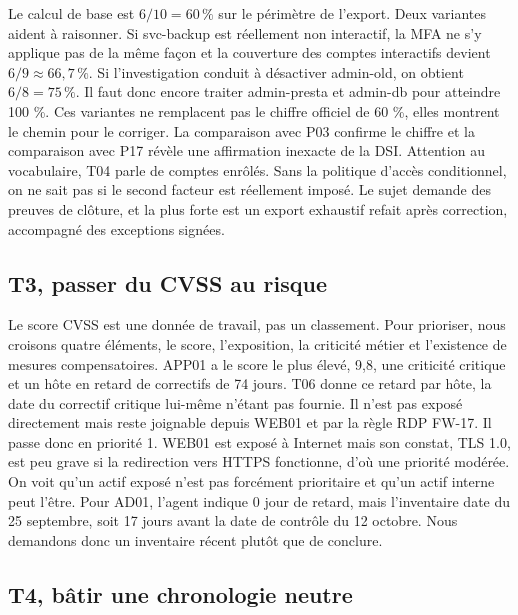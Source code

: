\documentclass[11pt,a4paper]{article}
\begin{document}
Le calcul de base est $6 / 10 = 60\,\%$ sur le périmètre de l'export. Deux variantes aident à raisonner. Si svc-backup est réellement non interactif, la MFA ne s'y applique pas de la même façon et la couverture des comptes interactifs devient $6 / 9 \approx 66{,}7\,\%$. Si l'investigation conduit à désactiver admin-old, on obtient $6 / 8 = 75\,\%$. Il faut donc encore traiter admin-presta et admin-db pour atteindre 100 \%. Ces variantes ne remplacent pas le chiffre officiel de 60 \%, elles montrent le chemin pour le corriger. La comparaison avec P03 confirme le chiffre et la comparaison avec P17 révèle une affirmation inexacte de la DSI. Attention au vocabulaire, T04 parle de comptes enrôlés. Sans la politique d'accès conditionnel, on ne sait pas si le second facteur est réellement imposé. Le sujet demande des preuves de clôture, et la plus forte est un export exhaustif refait après correction, accompagné des exceptions signées.

\subsection{T3, passer du CVSS au risque}

Le score CVSS est une donnée de travail, pas un classement. Pour prioriser, nous croisons quatre éléments, le score, l'exposition, la criticité métier et l'existence de mesures compensatoires. APP01 a le score le plus élevé, 9,8, une criticité critique et un hôte en retard de correctifs de 74 jours. T06 donne ce retard par hôte, la date du correctif critique lui-même n'étant pas fournie. Il n'est pas exposé directement mais reste joignable depuis WEB01 et par la règle RDP FW-17. Il passe donc en priorité 1. WEB01 est exposé à Internet mais son constat, TLS 1.0, est peu grave si la redirection vers HTTPS fonctionne, d'où une priorité modérée. On voit qu'un actif exposé n'est pas forcément prioritaire et qu'un actif interne peut l'être. Pour AD01, l'agent indique 0 jour de retard, mais l'inventaire date du 25 septembre, soit 17 jours avant la date de contrôle du 12 octobre. Nous demandons donc un inventaire récent plutôt que de conclure.

\subsection{T4, bâtir une chronologie neutre}
\end{document}
